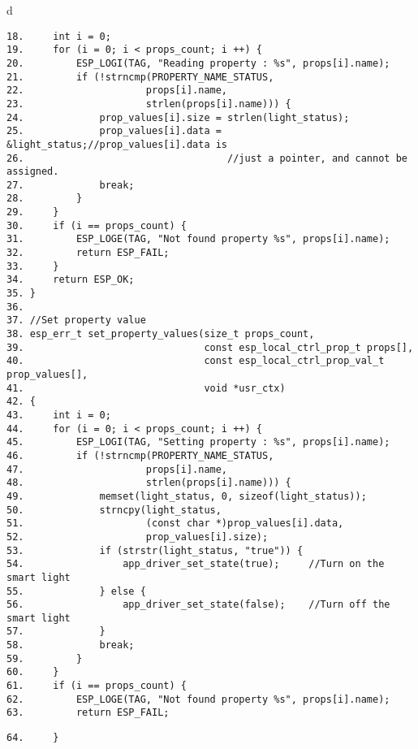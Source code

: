 \documentclass[a4paper,12pt]{book}
\begin{document}
\begin{codebloc}
\begin{tabular}{d}
\vspace{2pt}
\begin{verbatim}
18.     int i = 0;
19.     for (i = 0; i < props_count; i ++) {
20.         ESP_LOGI(TAG, "Reading property : %s", props[i].name);
21.         if (!strncmp(PROPERTY_NAME_STATUS,
22.                     props[i].name,
23.                     strlen(props[i].name))) {
24.             prop_values[i].size = strlen(light_status);
25.             prop_values[i].data = &light_status;//prop_values[i].data is 
26.                                   //just a pointer, and cannot be assigned.
27.             break;
28.         }
29.     }
30.     if (i == props_count) {
31.         ESP_LOGE(TAG, "Not found property %s", props[i].name);
32.         return ESP_FAIL;
33.     }
34.     return ESP_OK;
35. }
36.	
37. //Set property value
38. esp_err_t set_property_values(size_t props_count,
39.                               const esp_local_ctrl_prop_t props[],
40.                               const esp_local_ctrl_prop_val_t prop_values[],
41.                               void *usr_ctx)
42. {
43.     int i = 0;
44.     for (i = 0; i < props_count; i ++) {
45.         ESP_LOGI(TAG, "Setting property : %s", props[i].name);
46.         if (!strncmp(PROPERTY_NAME_STATUS,
47.                     props[i].name,
48.                     strlen(props[i].name))) {
49.             memset(light_status, 0, sizeof(light_status));
50.             strncpy(light_status,
51.                     (const char *)prop_values[i].data,
52.                     prop_values[i].size);
53.             if (strstr(light_status, "true")) {
54.                 app_driver_set_state(true); 	//Turn on the smart light
55.             } else {
56.                 app_driver_set_state(false);	//Turn off the smart light
57.             }
58.             break;
59.         }
60.     }
61.     if (i == props_count) {
62.         ESP_LOGE(TAG, "Not found property %s", props[i].name);
63.         return ESP_FAIL;
\end{verbatim}
\verb|64.     }|
\end{tabular}
\end{codebloc}
\end{document}
